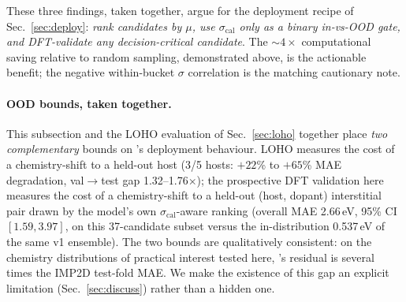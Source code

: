 These three findings, taken together, argue for the deployment
recipe of Sec.~\ref{sec:deploy}: \emph{rank candidates by $\mu$,
use $\sigma_{\mathrm{cal}}$ only as a binary in-vs-OOD gate, and
DFT-validate any decision-critical candidate}. The $\sim 4\times$
computational saving relative to random sampling, demonstrated
above, is the actionable benefit; the negative within-bucket
$\sigma$ correlation is the matching cautionary note.

\paragraph{OOD bounds, taken together.}
This subsection and the LOHO evaluation of Sec.~\ref{sec:loho}
together place \emph{two complementary} bounds on \modelname's
deployment behaviour. LOHO measures the cost of a chemistry-shift
to a held-out host (3/5 hosts: $+22$\% to $+65$\% MAE
degradation, val$\to$test gap 1.32--1.76$\times$); the prospective
DFT validation here measures the cost of a chemistry-shift to a
held-out (host, dopant) interstitial pair drawn by the model's own
$\sigma_{\mathrm{cal}}$-aware ranking (overall MAE
2.66\,eV, 95\% CI $[1.59, 3.97]$, on this 37-candidate subset
versus the in-distribution 0.537\,eV of the same v1 ensemble). The
two bounds are
qualitatively consistent: on the chemistry distributions of
practical interest tested here, \modelname's residual is several
times the IMP2D test-fold MAE. We make the existence of this gap
an explicit limitation (Sec.~\ref{sec:discuss}) rather than a
hidden one.
